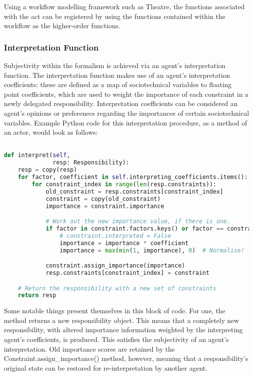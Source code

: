 Using a workflow modelling framework such as Theatre\cite{theatre_code}, the functions associated with the act can be registered by using the functions contained within the workflow as the higher-order functions.\par

\subsubsection{Interpretation Function}\label{subsec:interpretation_function}
Subjectivity within the formalism is achieved via an agent's interpretation function. The interpretation function makes use of an agent's interpretation coefficients: these are defined as a map of sociotechnical variables to floating point coefficients, which are used to weight the importance of each constraint in a newly delegated responsibility. Interpretation coefficients can be considered an agent's opinions or preferenecs regarding the importances of certain sociotechnical variables. Example Python code for this interpretation procedure, as a method of an actor, would look as follows:

\begin{lstlisting}[label=interpretation-python,caption=Example Python code for Interpretation Function, language=Python]

def interpret(self,
              resp: Responsibility):
    resp = copy(resp)
    for factor, coefficient in self.interpreting_coefficients.items():
        for constraint_index in range(len(resp.constraints)):
            old_constraint = resp.constraints[constraint_index]
            constraint = copy(old_constraint)
            importance = constraint.importance

            # Work out the new importance value, if there is one.
            if factor in constraint.factors.keys() or factor == constraint.__class__:
                # constraint.interpreted = False
                importance = importance * coefficient
                importance = max(min(1, importance), 0)  # Normalise!

            constraint.assign_importance(importance)
            resp.constraints[constraint_index] = constraint

    # Return the responsibility with a new set of constraints
    return resp
\end{lstlisting}

Some notable things present themselves in this block of code. For one, the method returns a new responsibility object. This means that a completely new responsibility, with altered importance information weighted by the interpreting agent's coefficients, is produced. This satisfies the subjectivity of an agent's interpretation. Old importance scores are retained by the Constraint.assign\_importance() method, however, meaning that a responsibility's original state can be restored for re-interpretation by another agent.\par

